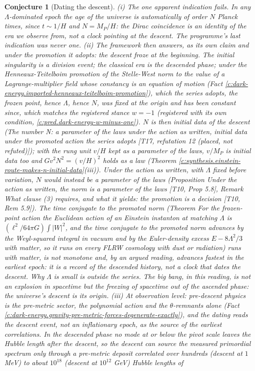 \documentclass[11pt]{article}
\newtheorem{conjecture}[theorem]{Conjecture}
\theoremstyle{definition}
\theoremstyle{plain}
\newcommand{\changedmark}[2]{\marginpar{\raggedright\scriptsize\color{#1}#2}}
\begin{document}
\begin{conjecture}[Dating the descent]\label{c:standard-model.dating-descent}
\changedmark{BrickRed}{corrected since the deposit}
(i) The one apparent indication fails. In any $\Lambda$-dominated epoch the age of the universe is automatically of order $N$ Planck times, since $t \sim 1/H$ and $N = M_{P}/H$: the Dirac coincidence is an identity of the era we observe from, not a clock pointing at the descent. The programme's last indication was never one. (ii) The framework then answers, as its own claim and under the promotion it adopts: the descent froze at the beginning. The initial singularity is a division event; the classical era is the descended phase; under the Henneaux-Teitelboim promotion of the Stelle-West norm to the value of a Lagrange-multiplier field whose constancy is an equation of motion (Fact \ref{c:dark-energy.imported-henneaux-teitelboim-promotion}), which the series adopts, the frozen point, hence $\Lambda$, hence $N$, was fixed at the origin and has been constant since, which matches the registered stance $w = -1$ (registered with its own condition, \ref{c:pred.dark-energy-w-minus-one}). $N$ is then initial data of the descent (\emph{The number N: a parameter of the laws under the action as written, initial data under the promoted action the series adopts} [T17, refutation 12 (placed, not refuted)]); with the rung unit $v/H$ kept as a parameter of the laws, $v/M_{P}$ is initial data too and $Gv^{2}N^{2} = (v/H)^{2}$ holds as a law (Theorem \ref{c:synthesis.einstein-route-makes-n-initial-data}(iii)). Under the action as written, with $\Lambda$ fixed before variation, $N$ would instead be a parameter of the laws (Proposition \emph{Under the action as written, the norm is a parameter of the laws} [T10, Prop 5.8], Remark \emph{What clause (3) requires, and what it yields: the promotion is a decision} [T10, Rem 5.9]). The time conjugate to the promoted norm (Theorem \emph{For the frozen-point action the Euclidean action of an Einstein instanton at matching $\Lambda$ is $(\ell^{2}/64\pi G)\int|W|^{2}$, and the time conjugate to the promoted norm advances by the Weyl-squared integral in vacuum and by the Euler-density excess $E - 8\Lambda^{2}/3$ with matter, so it runs on every FLRW cosmology with dust or radiation}) runs with matter, is not monotone and, by an argued reading, advances fastest in the earliest epoch: it is a record of the descended history, not a clock that dates the descent. Why $\Lambda$ is small is outside the series. The big bang, in this reading, is not an explosion in spacetime but the freezing of spacetime out of the ascended phase: the universe's descent is its origin. (iii) At observation level: pre-descent physics is the pre-metric sector, the polynomial action and the $\theta$-remnants alone (Fact \ref{c:dark-energy.gravity-pre-metric-forces-degenerate-exactly}), and the dating reads the descent event, not an inflationary epoch, as the source of the earliest correlations. In the descended phase no mode at or below the pivot scale leaves the Hubble length after the descent, so the descent can source the measured primordial spectrum only through a pre-metric deposit correlated over hundreds (descent at $1$ MeV) to about $10^{18}$ (descent at $10^{12}$ GeV) Hubble lengths of 
\end{conjecture}
\end{document}
